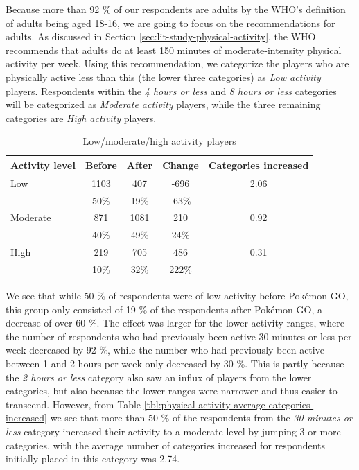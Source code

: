 Because more than 92 \% of our respondents are adults by the WHO's definition of adults being aged 18-16, we are going to focus on the recommendations for adults. As discussed in Section \ref{sec:lit-study-physical-activity}, the WHO recommends that adults do at least 150 minutes of moderate-intensity physical activity per week. Using this recommendation, we categorize the players who are physically active less than this (the lower three categories) as \emph{Low activity} players. Respondents within the \emph{4 hours or less} and \emph{8 hours or less} categories will be categorized as \emph{Moderate activity} players, while the three remaining categories are \emph{High activity} players.

\begin{table}
	\centering
	\caption{Low/moderate/high activity players}
	\label{tbl:physical-activity-low-moderate-high}
	\begin{tabular}{|l|c|c|c|c|}
		\hline
		\textbf{Activity level}	& \textbf{Before}	& \textbf{After}	& \textbf{Change}	& \textbf{Categories increased}\\
		\hline\hline
		Low		& 1103	& 407	& -696	& 2.06\\
				& 50\%	& 19\%	& -63\%	&\\\hline
		Moderate& 871	& 1081	& 210	& 0.92\\
				& 40\%	& 49\%	& 24\%	&\\\hline
		High	& 219	& 705	& 486	& 0.31\\
				& 10\%	& 32\%	& 222\%	&\\\hline
	\end{tabular}
\end{table}

We see that while 50 \% of respondents were of low activity before Pokémon GO, this group only consisted of 19 \% of the respondents after Pokémon GO, a decrease of over 60 \%. The effect was larger for the lower activity ranges, where the number of respondents who had previously been active 30 minutes or less per week decreased by 92 \%, while the number who had previously been active between 1 and 2 hours per week only decreased by 30 \%. This is partly because the \emph{2 hours or less} category also saw an influx of players from the lower categories, but also because the lower ranges were narrower and thus easier to transcend. However, from Table \ref{tbl:physical-activity-average-categories-increased} we see that more than 50 \% of the respondents from the \emph{30 minutes or less} category increased their activity to a moderate level by jumping 3 or more categories, with the average number of categories increased for respondents initially placed in this category was 2.74.


